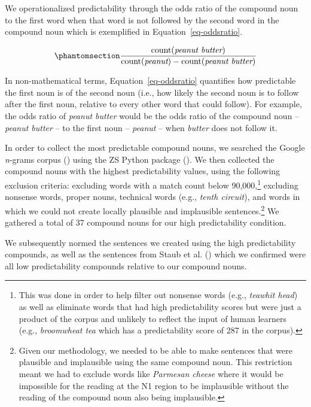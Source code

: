 \documentclass[
  12pt,
  letterpaper,
]{scrreprt}
\begin{document}
We operationalized predictability through the odds ratio of the compound
noun to the first word when that word is not followed by the second word
in the compound noun which is exemplified in
Equation~\ref{eq-oddsratio}.

\begin{equation}\phantomsection\label{eq-oddsratio}{
\frac{\mathrm{count(\textit{peanut butter})}}{\mathrm{count(\textit{peanut})} - \mathrm{count(\textit{peanut butter})}} 
}\end{equation}

In non-mathematical terms, Equation~\ref{eq-oddsratio} quantifies how
predictable the first noun is of the second noun (i.e., how likely the
second noun is to follow after the first noun, relative to every other
word that could follow). For example, the odds ratio of \emph{peanut
butter} would be the odds ratio of the compound noun -- \emph{peanut
butter} -- to the first noun -- \emph{peanut} -- when \emph{butter} does
not follow it.

In order to collect the most predictable compound nouns, we searched the
Google \emph{n}-grams corpus
() using the ZS Python package
(). We then collected
the compound nouns with the highest predictability values, using the
following exclusion criteria: excluding words with a match count below
90,000,\footnote{This was done in order to help filter out nonsense
  words (e.g., \emph{teawhit head}) as well as eliminate words that had
  high predictability scores but were just a product of the corpus and
  unlikely to reflect the input of human learners (e.g.,
  \emph{broomwheat tea} which has a predictability score of 287 in the
  corpus).} excluding nonsense words, proper nouns, technical words
(e.g., \emph{tenth circuit}), and words in which we could not create
locally plausible and implausible sentences.\footnote{Given our
  methodology, we needed to be able to make sentences that were
  plausible and implausible using the same compound noun. This
  restriction meant we had to exclude words like \emph{Parmesan cheese}
  where it would be impossible for the reading at the N1 region to be
  implausible without the reading of the compound noun also being
  implausible.} We gathered a total of 37 compound nouns for our high
predictability condition.

We subsequently normed the sentences we created using the high
predictability compounds, as well as the sentences from Staub et al.
() which we
confirmed were all low predictability compounds relative to our compound
nouns.
\end{document}

